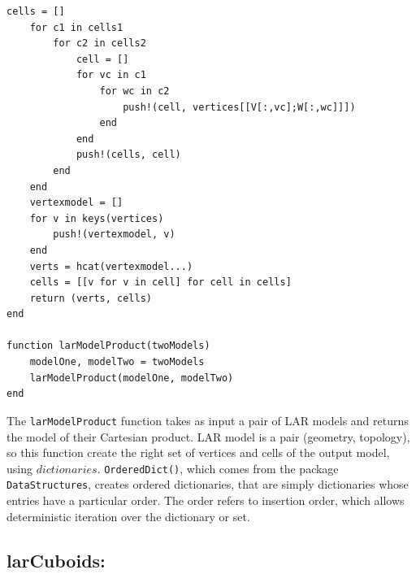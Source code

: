 \documentclass{article}
\begin{document}
\begin{flushleft}
\begin{list}{}{}
\begin{Verbatim}[tabsize=4]
    cells = []
    for c1 in cells1
        for c2 in cells2
            cell = []
            for vc in c1
                for wc in c2 
                    push!(cell, vertices[[V[:,vc];W[:,wc]]])
                end
            end
            push!(cells, cell)
        end
    end
    vertexmodel = []
    for v in keys(vertices)
        push!(vertexmodel, v)
    end
    verts = hcat(vertexmodel...)
    cells = [[v for v in cell] for cell in cells]
    return (verts, cells)
end

function larModelProduct(twoModels)
    modelOne, modelTwo = twoModels
    larModelProduct(modelOne, modelTwo)
end
\end{Verbatim}
\end{list}
\vspace{-1ex}
\footnotesize\addtolength{\baselineskip}{-1ex}
\end{flushleft}
The \texttt{larModelProduct} function takes as input a pair of LAR models and returns the model of their Cartesian product. LAR model is a pair (geometry, topology), so this function create the right set of vertices and cells of the output model, using $dictionaries$. \texttt{OrderedDict()}, which comes from the package \texttt{DataStructures}, creates ordered dictionaries, that are simply dictionaries whose entries have a particular order. The order refers to insertion order, which allows deterministic iteration over the dictionary or set.

\subsection{larCuboids:}
\end{document}
